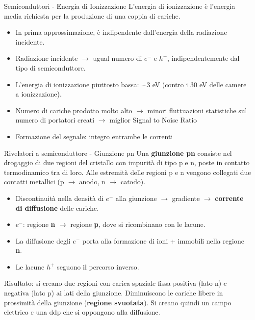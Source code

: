\documentclass{beamer}
\begin{document}
\begin{frame}{Semiconduttori - Energia di Ionizzazione}
   L'energia di ionizzazione è l’energia media richiesta per la produzione di una coppia di cariche.
   \begin{itemize}
       \item In prima approssimazione, è indipendente dall'energia della radiazione incidente.
       \item Radiazione incidente $\to$ ugual numero di $e^-$ e $h^+$, indipendentemente dal tipo di semiconduttore.
       \item L'energia di ionizzazione piuttosto bassa: $\sim 3$ eV (contro i 30 eV delle camere a ionizzazione).
       \item Numero di cariche prodotto molto alto $\to$ minori fluttuazioni statistiche sul numero di portatori creati $\to$ miglior Signal to Noise Ratio
       \item Formazione del segnale: integro entrambe le correnti
   \end{itemize}
\end{frame}

\begin{frame}{Rivelatori a semiconduttore - Giunzione pn}
Una \textbf{giunzione pn} consiste nel drogaggio di due regioni del cristallo con impurità di tipo p e n, poste in contatto termodinamico tra di loro. Alle estremità delle regioni p e n vengono collegati due contatti metallici (p $\to$ anodo, n $\to$ catodo).
    \begin{itemize}
        \item Discontinuità nella densità di $e^-$ alla giunzione $\to$ gradiente $\to$ \textbf{corrente di diffusione} delle cariche.
        \item $e^-$: regione \textbf{n} $\to$ regione \textbf{p}, dove si ricombinano con le lacune.
        \item La diffusione degli $e^-$ porta alla formazione di ioni + immobili nella regione \textbf{n}.
        \item Le lacune $h^+$ seguono il percorso inverso.
    \end{itemize}
    \medskip
    Risultato: si creano due regioni con carica spaziale fissa positiva (lato n) e negativa (lato p) ai lati della giunzione. Diminuiscono le cariche libere in prossimità della giunzione (\textbf{regione svuotata}). Si creano quindi un campo elettrico e una ddp che si oppongono alla diffusione.
\end{frame}
\end{document}
